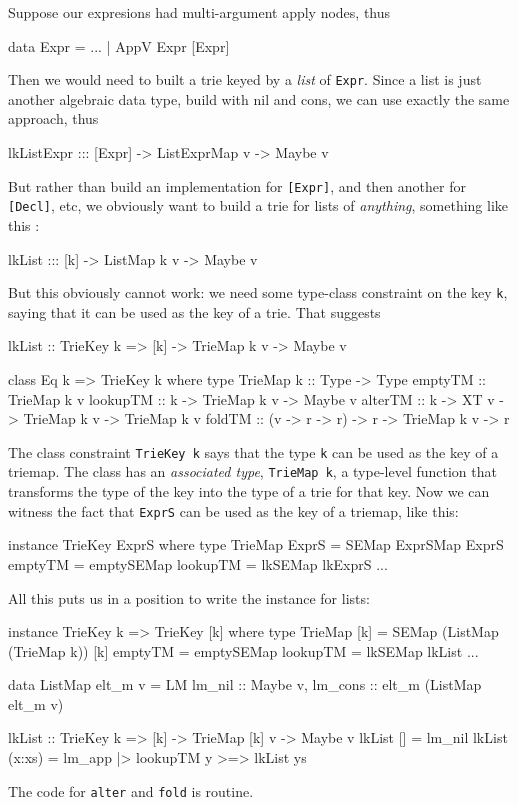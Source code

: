 \documentclass[acmsmall]{acmart}
\theoremstyle{theorem}
\theoremstyle{definition}
\theoremstyle{remark}
\begin{document}
Suppose our expresions had multi-argument apply nodes, thus
\begin{code}
data Expr = ...
          | AppV Expr [Expr]
\end{code}
Then we would need to built a trie keyed by a \emph{list} of \lstinline{Expr}.
Since a list is just another algebraic data type, build with nil and cons,
we can use exactly the same approach, thus
\begin{code}
lkListExpr ::: [Expr] -> ListExprMap v -> Maybe v
\end{code}
But rather than build an implementation
for \lstinline{[Expr]}, and then another for \lstinline{[Decl]}, etc, we obviously
want to build a trie for lists of \emph{anything}, something like this \cite{hinze}:
\begin{code}
lkList ::: [k] -> ListMap k v -> Maybe v
\end{code}
But this obviously cannot work: we need some type-class constraint on the key \lstinline{k},
saying that it can be used as the key of a trie.   That suggests
\begin{code}
lkList :: TrieKey k => [k] -> TrieMap k v -> Maybe v

class Eq k => TrieKey k where
  type TrieMap k :: Type -> Type
  emptyTM  :: TrieMap k v
  lookupTM :: k -> TrieMap k v -> Maybe v
  alterTM  :: k -> XT v -> TrieMap k v -> TrieMap k v
  foldTM   :: (v -> r -> r) -> r -> TrieMap k v -> r
\end{code}
The class constraint \lstinline{TrieKey k} says that the type \lstinline{k}
can be used as the key of a triemap.
The class has an \emph{associated type}, \lstinline{TrieMap k},
a type-level function that transforms the type of the key into
the type of a trie for that key.  Now we can witness the fact that \lstinline{ExprS} can be
used as the key of a triemap, like this:
\begin{code}
instance TrieKey ExprS where
  type TrieMap ExprS = SEMap ExprSMap ExprS
  emptyTM  = emptySEMap
  lookupTM = lkSEMap lkExprS
  ...
\end{code}
All this puts us in a position to write the instance for lists:
\begin{code}
instance TrieKey k => TrieKey [k] where
  type TrieMap [k] = SEMap (ListMap (TrieMap k)) [k]
  emptyTM  = emptySEMap
  lookupTM = lkSEMap lkList
  ...

data ListMap elt_m v = LM { lm_nil  :: Maybe v, lm_cons :: elt_m (ListMap elt_m  v) }

lkList :: TrieKey k => [k] -> TrieMap [k] v -> Maybe v
lkList []     = lm_nil
lkList (x:xs) = lm_app |> lookupTM y >=> lkList ys
\end{code}
The code for \lstinline{alter} and \lstinline{fold} is routine.
\end{document}
